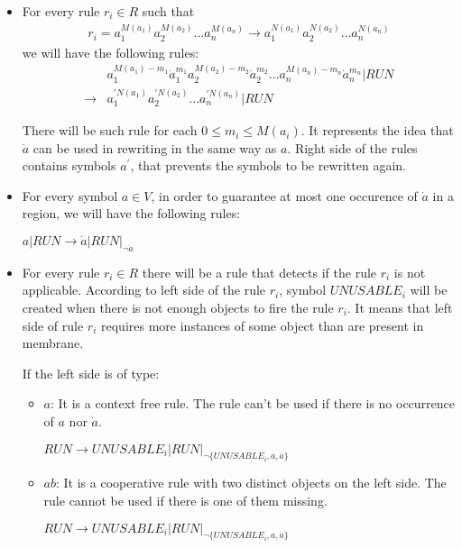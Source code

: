 \begin{dokaz}

  \begin{itemize}
    \item For every rule $r_i\in R$ such that
      \begin{align*}
        r_i = a_1^{M(a_1)}a_2^{M(a_2)}\dots a_n^{M(a_n)} \rightarrow a_1^{N(a_1)}a_2^{N(a_2)}\dots a_n^{N(a_n)}
      \end{align*}
      we will have the following rules:
      \begin{align*}
        &a_1^{M(a_1)-m_1}\dot{a}_1^{m_1}
        a_2^{M(a_2)-m_2}\dot{a}_2^{m_2}\dots
        a_n^{M(a_n)-m_n}\dot{a}_n^{m_n}|RUN \\
        \rightarrow &a_1^{\prime N(a_1)}a_2^{\prime N(a_2)}\dots a_n^{\prime N(a_n)}|RUN
      \end{align*}
      
      There will be such rule for each $0\leq m_i\leq M(a_i)$. It represents the idea that $\dot{a}$ can be used in rewriting in the same way as $a$. Right side of the rules contains symbols $a^\prime$, that prevents the symbols to be rewritten again.

    \item For every symbol $a\in V$, in order to guarantee at most one occurence of $\dot{a}$ in a region, we will have the following rules:

    $a|RUN \rightarrow \dot{a}|RUN|_{\neg \dot{a}}$

    \item For every rule $r_i\in R$ there will be a rule that detects if the rule $r_i$ is not applicable. According to left side of the rule $r_i$, symbol $UNUSABLE_i$ will be created when there is not enough objects to fire the rule $r_i$. It means that left side of rule $r_i$ requires more instances of some object than are present in membrane.

    If the left side is of type:
    \begin{itemize}
      \item $a$: It is a context free rule. The rule can't be used if there is no occurrence of $a$ nor $\dot{a}$.

      $RUN \rightarrow UNUSABLE_i|RUN|_{\neg\{UNUSABLE_i, a, \dot{a}\}}$

      \item $ab$: It is a cooperative rule with two distinct objects on the left side. The rule cannot be used if there is one of them missing.

      $RUN \rightarrow UNUSABLE_i|RUN|_{\neg\{UNUSABLE_i, a, \dot{a}\}}$


\end{itemize}
\end{itemize}
\end{dokaz}
